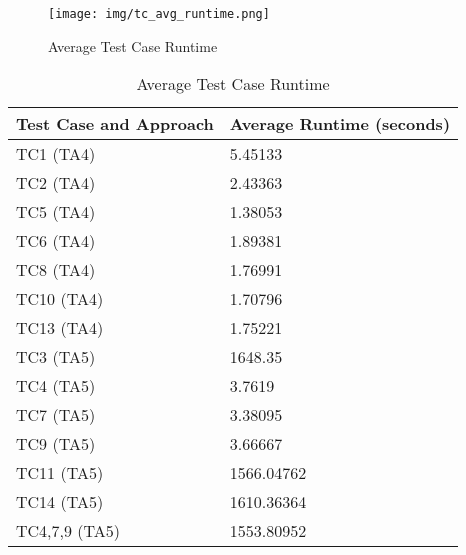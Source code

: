 \begin{figure}[ht]
  \centering
  \texttt{[image: img/tc\_avg\_runtime.png]}
  \caption{Average Test Case Runtime}
  \label{fig:tc_avg_runtime}
\end{figure}

\begin{table}[h!]
  \begin{tabular}{|l | l|}
    \hline
    \textbf{Test Case and Approach} & \textbf{Average Runtime (seconds)} \\
    \hline
    TC1 (TA4) & 5.45133 \\
    \hline
    TC2 (TA4) & 2.43363 \\
    \hline
    TC5 (TA4) & 1.38053 \\
    \hline
    TC6 (TA4) & 1.89381 \\
    \hline
    TC8 (TA4) & 1.76991 \\
    \hline
    TC10 (TA4) & 1.70796 \\
    \hline
    TC13 (TA4) & 1.75221 \\
    \hline
    TC3 (TA5) & 1648.35 \\
    \hline
    TC4 (TA5) & 3.7619 \\
    \hline
    TC7 (TA5) & 3.38095 \\
    \hline
    TC9 (TA5) & 3.66667 \\
    \hline
    TC11 (TA5) & 1566.04762 \\
    \hline
    TC14 (TA5) & 1610.36364 \\
    \hline
    TC4,7,9 (TA5) & 1553.80952 \\
    \hline
  \end{tabular}
  \caption{Average Test Case Runtime}
  \label{tab:tc_avg_runtime}
\end{table}

